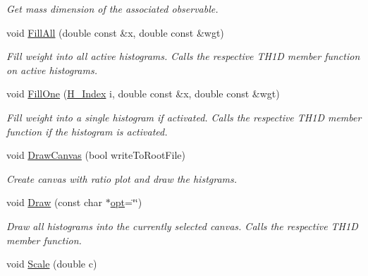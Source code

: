 \begin{DoxyCompactItemize}
\begin{DoxyCompactList}\small\item\em Get mass dimension of the associated observable. \end{DoxyCompactList}\item 
void \hyperlink{classHistArray_ae8d7189d1f2b9710a3228deac3eb1fa4}{Fill\+All} (double const \&x, double const \&wgt)
\begin{DoxyCompactList}\small\item\em Fill weight into all active histograms. Calls the respective T\+H1\+D member function on active histograms. \end{DoxyCompactList}\item 
void \hyperlink{classHistArray_a1f29f32f1eab7ee9315b93000387bd56}{Fill\+One} (\hyperlink{HistArray_8h_abdf25c9f0ab78c4243f63cb2bacf26d9}{H\+\_\+\+Index} i, double const \&x, double const \&wgt)
\begin{DoxyCompactList}\small\item\em Fill weight into a single histogram if activated. Calls the respective T\+H1\+D member function if the histogram is activated. \end{DoxyCompactList}\item 
void \hyperlink{classHistArray_affb2356ef7063d7dad7873fe41dd95c8}{Draw\+Canvas} (bool write\+To\+Root\+File)
\begin{DoxyCompactList}\small\item\em Create canvas with ratio plot and draw the histgrams. \end{DoxyCompactList}\item 
void \hyperlink{classHistArray_a4ebaa67b67958c1ee70ebdb056b5a389}{Draw} (const char $\ast$\hyperlink{structopt}{opt}=\char`\"{}\char`\"{})
\begin{DoxyCompactList}\small\item\em Draw all histograms into the currently selected canvas. Calls the respective T\+H1\+D member function. \end{DoxyCompactList}\item 
\hypertarget{classHistArray_a64fb4832bfab2d8e2e47e56d99902236}{}void \hyperlink{classHistArray_a64fb4832bfab2d8e2e47e56d99902236}{Scale} (double c)\label{classHistArray_a64fb4832bfab2d8e2e47e56d99902236}


\end{DoxyCompactItemize}
